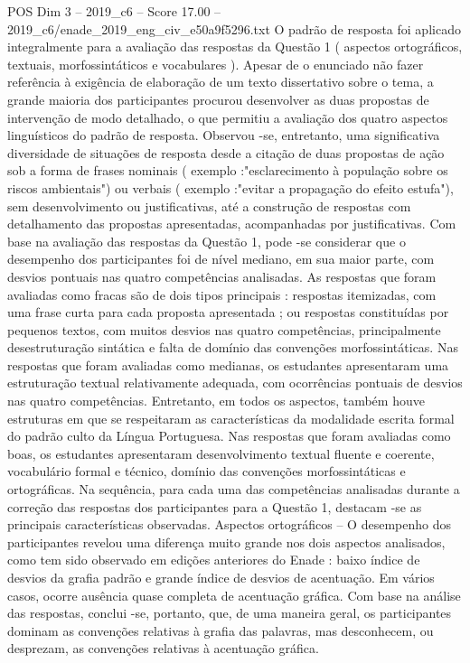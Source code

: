 \begin{textsample}{POS Dim 3 – 2019\_c6 – Score 17.00 – 2019\_c6/enade\_2019\_eng\_civ\_e50a9f5296.txt}
O padrão de resposta foi aplicado integralmente para a avaliação das respostas da Questão 1 ( aspectos ortográficos, textuais, morfossintáticos e vocabulares ).
Apesar de o enunciado não fazer referência à exigência de elaboração de um texto dissertativo sobre o tema, a grande maioria dos participantes procurou desenvolver as duas propostas de intervenção de modo detalhado, o que permitiu a avaliação dos quatro aspectos linguísticos do padrão de resposta.
Observou -se, entretanto, uma significativa diversidade de situações de resposta desde a citação de duas propostas de ação sob a forma de frases nominais ( exemplo :"esclarecimento à população sobre os riscos ambientais") ou verbais ( exemplo :"evitar a propagação do efeito estufa"), sem desenvolvimento ou justificativas, até a construção de respostas com detalhamento das propostas apresentadas, acompanhadas por justificativas.
Com base na avaliação das respostas da Questão 1, pode -se considerar que o desempenho dos participantes foi de nível mediano, em sua maior parte, com desvios pontuais nas quatro competências analisadas.
As respostas que foram avaliadas como fracas são de dois tipos principais : respostas itemizadas, com uma frase curta para cada proposta apresentada ; ou respostas constituídas por pequenos textos, com muitos desvios nas quatro competências, principalmente desestruturação sintática e falta de domínio das convenções morfossintáticas.
Nas respostas que foram avaliadas como medianas, os estudantes apresentaram uma estruturação textual relativamente adequada, com ocorrências pontuais de desvios nas quatro competências.
Entretanto, em todos os aspectos, também houve estruturas em que se respeitaram as características da modalidade escrita formal do padrão culto da Língua Portuguesa.
Nas respostas que foram avaliadas como boas, os estudantes apresentaram desenvolvimento textual fluente e coerente, vocabulário formal e técnico, domínio das convenções morfossintáticas e ortográficas.
Na sequência, para cada uma das competências analisadas durante a correção das respostas dos participantes para a Questão 1, destacam -se as principais características observadas.
Aspectos ortográficos – O desempenho dos participantes revelou uma diferença muito grande nos dois aspectos analisados, como tem sido observado em edições anteriores do Enade : baixo índice de desvios da grafia padrão e grande índice de desvios de acentuação.
Em vários casos, ocorre ausência quase completa de acentuação gráfica.
Com base na análise das respostas, conclui -se, portanto, que, de uma maneira geral, os participantes dominam as convenções relativas à grafia das palavras, mas desconhecem, ou desprezam, as convenções relativas à acentuação gráfica.

\end{textsample}
